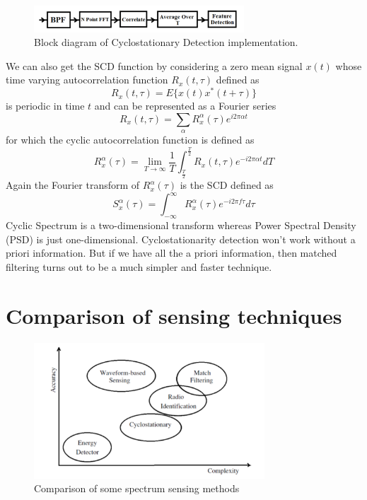 \begin{figure}
\centering
\includegraphics[width=0.7\textwidth]{csd}
\caption[Cyclostationary Detection implementation]{Block diagram 
of Cyclostationary Detection implementation.}
\label{csd}
\end{figure}

We can also get the SCD function by considering a zero mean signal $x(t)$
whose time varying autocorrelation function $R_x(t,\tau)$ defined as
\cite{prithvi11}
\begin{equation*}
    R_{x}(t,\tau) = E\{x(t)x^{\ast}(t+\tau)\}
\end{equation*}
is periodic in time $t$ and can be represented as a Fourier series
\begin{equation*}
    R_{x}(t,\tau) = \sum_{\alpha}R_{x}^{\alpha} (\tau)e^{i2\pi\alpha t} 
\end{equation*}
for which the cyclic autocorrelation function is defined as
\begin{equation*}
    R_{x}^{\alpha}(\tau) = \lim_{T\rightarrow\infty} {\frac{1}{T}}
    \int_{\frac{T}{2}}^{\frac{T}{2}}R_{x}(t,\tau)e^{-i2\pi\alpha t}dT
\end{equation*}
Again the Fourier transform of $R_{x}^{\alpha}(\tau)$ is the SCD defined as
\begin{equation*}
    S_{x}^{\alpha}(\tau)=\int_{-\infty}^{\infty}R_{x}^{\alpha}
    (\tau)e^{-i2\pi f\tau}d\tau
\end{equation*}
Cyclic Spectrum is a two-dimensional transform whereas Power Spectral Density
(PSD) is just one-dimensional. Cyclostationarity detection won't work without
a priori information. But if we have all the a priori information, then 
matched filtering turns out to be a much simpler and faster technique.

\section{Comparison of sensing techniques}

\begin{figure}
\centering
\includegraphics[width=0.77\textwidth]{compareSensing}
\caption[Comparison of sensing methods]{Comparison of some spectrum sensing 
methods}
\label{compareSensing}
\end{figure}

